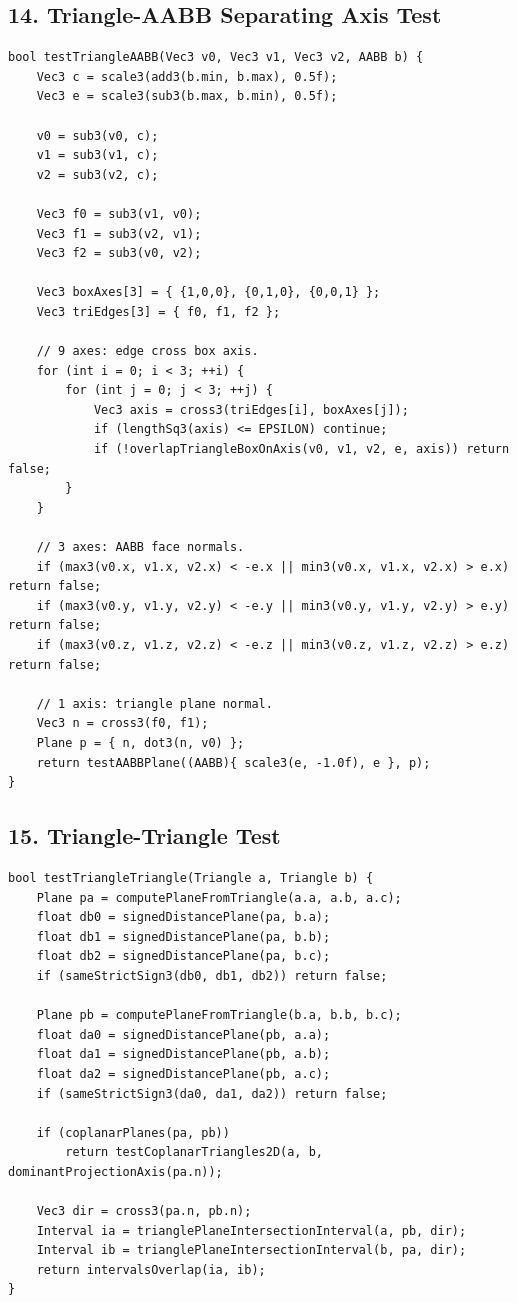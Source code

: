 \documentclass[10pt,letterpaper]{article}
\begin{document}
\subsection*{14. Triangle-AABB Separating Axis Test}

\begin{verbatim}
bool testTriangleAABB(Vec3 v0, Vec3 v1, Vec3 v2, AABB b) {
    Vec3 c = scale3(add3(b.min, b.max), 0.5f);
    Vec3 e = scale3(sub3(b.max, b.min), 0.5f);

    v0 = sub3(v0, c);
    v1 = sub3(v1, c);
    v2 = sub3(v2, c);

    Vec3 f0 = sub3(v1, v0);
    Vec3 f1 = sub3(v2, v1);
    Vec3 f2 = sub3(v0, v2);

    Vec3 boxAxes[3] = { {1,0,0}, {0,1,0}, {0,0,1} };
    Vec3 triEdges[3] = { f0, f1, f2 };

    // 9 axes: edge cross box axis.
    for (int i = 0; i < 3; ++i) {
        for (int j = 0; j < 3; ++j) {
            Vec3 axis = cross3(triEdges[i], boxAxes[j]);
            if (lengthSq3(axis) <= EPSILON) continue;
            if (!overlapTriangleBoxOnAxis(v0, v1, v2, e, axis)) return false;
        }
    }

    // 3 axes: AABB face normals.
    if (max3(v0.x, v1.x, v2.x) < -e.x || min3(v0.x, v1.x, v2.x) > e.x) return false;
    if (max3(v0.y, v1.y, v2.y) < -e.y || min3(v0.y, v1.y, v2.y) > e.y) return false;
    if (max3(v0.z, v1.z, v2.z) < -e.z || min3(v0.z, v1.z, v2.z) > e.z) return false;

    // 1 axis: triangle plane normal.
    Vec3 n = cross3(f0, f1);
    Plane p = { n, dot3(n, v0) };
    return testAABBPlane((AABB){ scale3(e, -1.0f), e }, p);
}
\end{verbatim}


\subsection*{15. Triangle-Triangle Test}

\begin{verbatim}
bool testTriangleTriangle(Triangle a, Triangle b) {
    Plane pa = computePlaneFromTriangle(a.a, a.b, a.c);
    float db0 = signedDistancePlane(pa, b.a);
    float db1 = signedDistancePlane(pa, b.b);
    float db2 = signedDistancePlane(pa, b.c);
    if (sameStrictSign3(db0, db1, db2)) return false;

    Plane pb = computePlaneFromTriangle(b.a, b.b, b.c);
    float da0 = signedDistancePlane(pb, a.a);
    float da1 = signedDistancePlane(pb, a.b);
    float da2 = signedDistancePlane(pb, a.c);
    if (sameStrictSign3(da0, da1, da2)) return false;

    if (coplanarPlanes(pa, pb))
        return testCoplanarTriangles2D(a, b, dominantProjectionAxis(pa.n));

    Vec3 dir = cross3(pa.n, pb.n);
    Interval ia = trianglePlaneIntersectionInterval(a, pb, dir);
    Interval ib = trianglePlaneIntersectionInterval(b, pa, dir);
    return intervalsOverlap(ia, ib);
}
\end{verbatim}
\end{document}
